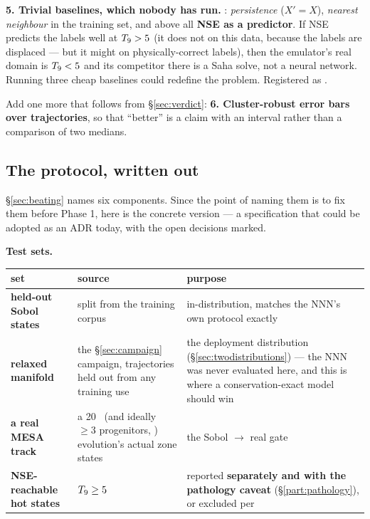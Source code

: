 \textbf{5. Trivial baselines, which nobody has run.} :
\emph{persistence} ($X' = X$), \emph{nearest neighbour} in the training set,
and above all \textbf{NSE as a predictor}. If NSE predicts the labels well at
$T_{9} > 5$ (it does not on this data, because the labels are displaced --- but
it might on physically-correct labels), then the emulator's real domain is
$T_{9} < 5$ and its competitor there is a Saha solve, not a neural network.
Running three cheap baselines could redefine the problem. Registered as
.

Add one more that follows from \S\ref{sec:verdict}: \textbf{6. Cluster-robust
error bars over trajectories}, so that ``better'' is a claim with an interval
rather than a comparison of two medians.

\subsection{The protocol, written out}
\label{sec:protocol}

\S\ref{sec:beating} names six components. Since the point of naming them is to
fix them before Phase 1, here is the concrete version --- a specification that
could be adopted as an ADR today, with the open decisions marked.

\textbf{Test sets.}

\begingroup\small
\begin{tabularx}{\textwidth}{@{}L{3.2cm} L{5.0cm} Y@{}}
\toprule
\textbf{set} & \textbf{source} & \textbf{purpose} \\
\midrule
\textbf{held-out Sobol states} &  split from the training
  corpus & in-distribution, matches the NNN's own protocol exactly \\
\textbf{relaxed manifold} & the \S\ref{sec:campaign} campaign, trajectories
  held out from any training use & the deployment distribution
  (\S\ref{sec:twodistributions}) --- the NNN was never evaluated here, and this
  is where a conservation-exact model should win \\
\textbf{a real MESA track} & a 20~\Msun{} (and ideally $\ge 3$ progenitors,
  ) evolution's actual zone states & the  Sobol
  $\to$ real gate \\
\textbf{NSE-reachable hot states} & $T_{9} \ge 5$ & reported \textbf{separately
  and with the pathology caveat} (\S\ref{part:pathology}), or excluded per
   \\
\bottomrule
\end{tabularx}
\endgroup

